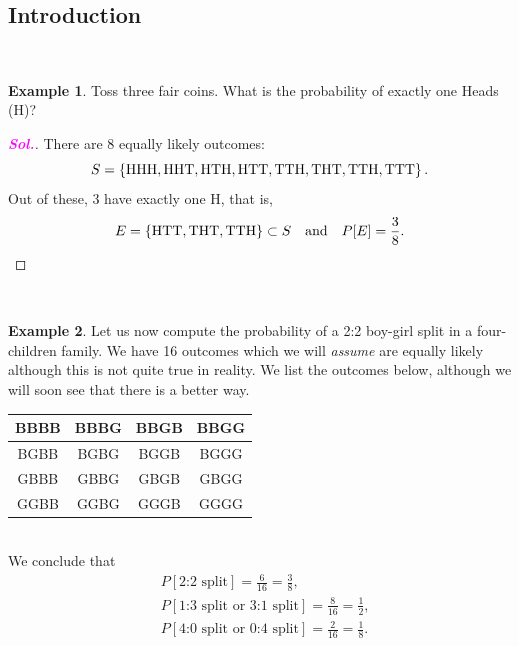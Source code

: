\documentclass[12pt,a4paper]{article}
\theoremstyle{definition}
\newtheorem{example}{Example}[section]
\theoremstyle{definition}
\theoremstyle{definition}
\theoremstyle{definition}
\theoremstyle{remark}
\theoremstyle{definition}
\newcommand{\sol}{\textcolor{magenta}{\bf \textit{Sol.}}\quad}
\begin{document}
\subsection{Introduction}
\
\begin{example}
	Toss three fair coins. What is the probability of exactly one Heads (H)?\begin{proof}[\sol]
		There are 8 equally likely outcomes: \[
		S=\set{\text{HHH},\text{HHT},\text{HTH},\text{HTT},\text{TTH},\text{THT},\text{TTH},\text{TTT}}.
		\] Out of these, 3 have exactly one H, that is, \[
		E=\set{\text{HTT},\text{THT},\text{TTH}}\subset S\quad\text{and}\quad P[E]=\frac{3}{8}.
		\]
	\end{proof}
\end{example}
\
\begin{example}
	Let us now compute the probability of a 2:2 boy-girl split in a four-children family. We have 16 outcomes which we will \textit{assume} are equally likely although this is not quite true in reality. We list the outcomes below, although we will soon see that there is a better way.\begin{table}[h!]
		\centering\begin{tabular}{|c|c|c|c|}
			\toprule
			BBBB & BBBG & BBGB & BBGG\\
			\hline
			BGBB & BGBG & BGGB & BGGG\\
			\hline
			GBBB & GBBG & GBGB & GBGG\\
			\hline
			GGBB & GGBG & GGGB & GGGG\\
			\bottomrule
		\end{tabular}
	\end{table}\\ We conclude that \begin{align*}
&P[\text{2:2 split}]=\frac{6}{16}=\frac{3}{8},\\
&P[\text{1:3 split or 3:1 split}]=\frac{8}{16}=\frac{1}{2},\\
&P[\text{4:0 split or 0:4 split}]=\frac{2}{16}=\frac{1}{8}.
\end{align*}
\end{example}
\
\end{document}
